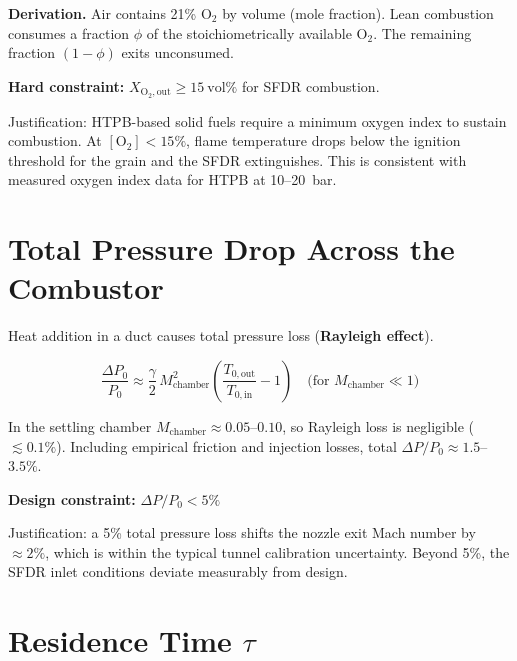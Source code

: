 \documentclass[12pt,a4paper]{report}
\begin{document}
\noindent\textbf{Derivation.} Air contains 21\% O$_2$ by volume (mole
fraction). Lean combustion consumes a fraction $\phi$ of the stoichiometrically
available O$_2$. The remaining fraction $(1-\phi)$ exits unconsumed.

\begin{infobox}
\textbf{Hard constraint:}
$X_{\text{O}_2,\text{out}} \geq 15\ \text{vol\%}$
for SFDR combustion.

Justification: HTPB-based solid fuels require a minimum oxygen index to
sustain combustion. At $[\text{O}_2] < 15\%$, flame temperature drops below
the ignition threshold for the grain and the SFDR extinguishes. This is
consistent with measured oxygen index data for HTPB at 10--20~bar.
\end{infobox}

\section{Total Pressure Drop Across the Combustor}

Heat addition in a duct causes total pressure loss (\textbf{Rayleigh effect}).

\begin{formulabox}
\begin{equation}
  \frac{\Delta P_0}{P_0}
  \approx \frac{\gamma}{2}\,M_\text{chamber}^2
          \left(\frac{T_{0,\text{out}}}{T_{0,\text{in}}}-1\right)
  \quad \text{(for }M_\text{chamber}\ll 1\text{)}
  \label{eq:rayleigh}
\end{equation}
\end{formulabox}

In the settling chamber $M_\text{chamber}\approx0.05$--$0.10$, so Rayleigh
loss is negligible ($\lesssim 0.1\%$). Including empirical friction and
injection losses, total $\Delta P/P_0 \approx 1.5$--$3.5\%$.

\begin{center}
\textbf{Design constraint:} $\Delta P/P_0 < 5\%$
\end{center}

Justification: a 5\% total pressure loss shifts the nozzle exit Mach number
by $\approx 2\%$, which is within the typical tunnel calibration uncertainty.
Beyond 5\%, the SFDR inlet conditions deviate measurably from design.

\section{Residence Time $\tau$}
\end{document}
